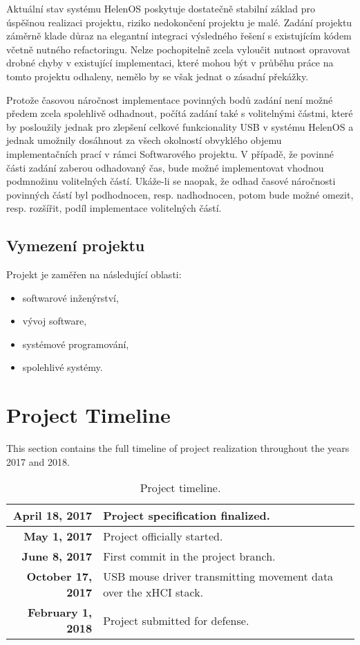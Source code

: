 Aktuální stav systému HelenOS poskytuje dostatečně stabilní základ pro úspěšnou realizaci
projektu, riziko nedokončení projektu je malé. Zadání projektu záměrně klade důraz na elegantní
integraci výsledného řešení s existujícím kódem včetně nutného refactoringu. Nelze pochopitelně
zcela vyloučit nutnost opravovat drobné chyby v existující implementaci, které mohou být
v průběhu práce na tomto projektu odhaleny, nemělo by se však jednat o zásadní překážky.

Protože časovou náročnost implementace povinných bodů zadání není možné předem zcela
spolehlivě odhadnout, počítá zadání také s volitelnými částmi, které by posloužily jednak pro
zlepšení celkové funkcionality USB v systému HelenOS a jednak umožnily dosáhnout za všech
okolností obvyklého objemu implementačních prací v rámci Softwarového projektu. V případě, že
povinné části zadání zaberou odhadovaný čas, bude možné implementovat vhodnou podmnožinu
volitelných částí. Ukáže-li se naopak, že odhad časové náročnosti povinných částí byl
podhodnocen, resp. nadhodnocen, potom bude možné omezit, resp. rozšířit, podíl implementace
volitelných částí.


\subsection{Vymezení projektu}

Projekt je zaměřen na následující oblasti:
~
\begin{itemize}
	\item softwarové inženýrství,
	\item vývoj software,
	\item systémové programování,
	\item spolehlivé systémy.
\end{itemize}


\section{Project Timeline}

This section contains the full timeline of project realization throughout the
years 2017 and 2018.

\begin{table}[h]
	\centering
	{\renewcommand{\arraystretch}{1.2}
	\begin{tabularx}{0.95\textwidth}{rl}
		\hline \textbf{April 18, 2017} & Project specification finalized. \\
		\hline \textbf{May 1, 2017} & Project officially started. \\
		\hline \textbf{June 8, 2017} & First commit in the project branch. \\
		\hline \textbf{October 17, 2017} & USB mouse driver transmitting
		movement data over the xHCI stack. \\


		\hline \textbf{February 1, 2018} & Project submitted for defense. \\
		\hline
	\end{tabularx}
	}
	\caption{Project timeline.}
	\label{tbl:timeline}
\end{table}

